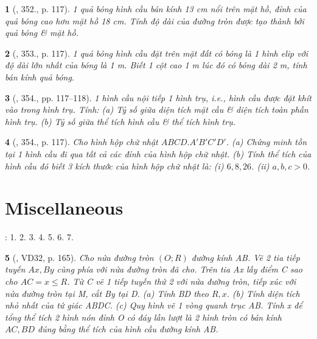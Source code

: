 \documentclass{article}
\newtheorem{baitoan}{}
\begin{document}
\begin{baitoan}[\cite{Binh_Toan_9_tap_2}, 352., p. 117]
	1 quả bóng hình cầu bán kính {\rm13 cm} nổi trên mặt hồ, đỉnh của quả bóng cao hơn mặt hồ {\rm18 cm}. Tính độ dài của đường tròn được tạo thành bởi quả bóng \& mặt hồ.
\end{baitoan}

\begin{baitoan}[\cite{Binh_Toan_9_tap_2}, 353., p. 117]
	1 quả bóng hình cầu đặt trên mặt đất có bóng là 1 hình elip với độ dài lớn nhất của bóng là {\rm1 m}. Biết 1 cột cao {\rm1 m} lúc đó có bóng dài {\rm2 m}, tính bán kính quả bóng.
\end{baitoan}

\begin{baitoan}[\cite{Binh_Toan_9_tap_2}, 354., pp. 117--118]
	1 hình cầu nội tiếp 1 hình trụ, i.e., hình cầu được đặt khít vào trong hình trụ. Tính: (a) Tỷ số giữa diện tích mặt cầu \& diện tích toàn phần hình trụ. (b) Tỷ số giữa thể tích hình cầu \& thể tích hình trụ.
\end{baitoan}

\begin{baitoan}[\cite{Binh_Toan_9_tap_2}, 354., p. 117]
	Cho hình hộp chữ nhật $ABCD.A'B'C'D'$. (a) Chứng minh tồn tại 1 hình cầu đi qua tất cả các đỉnh của hình hộp chữ nhật. (b) Tính thể tích của hình cầu đó biết 3 kích thước của hình hộp chữ nhật là: (i) $6,8,26$. (ii) $a,b,c > 0$.
\end{baitoan}


\section{Miscellaneous}
\cite[BTCCX, pp. 109--110]{SGK_Toan_9_Canh_Dieu_tap_1}: 1. 2. 3. 4. 5. 6. 7.

\begin{baitoan}[\cite{Tuyen_Toan_9_old}, VD32, p. 165]
	Cho nửa đường tròn $(O;R)$ đường kính AB. Vẽ 2 tia tiếp tuyến $Ax,By$ cùng phía với nửa đường tròn đã cho. Trên tia Ax lấy điểm C sao cho $AC = x\le R$. Từ C vẽ 1 tiếp tuyến thứ 2 với nửa đường tròn, tiếp xúc với nửa đường tròn tại M, cắt By tại D. (a) Tính BD theo $R,x$. (b) Tính diện tích nhỏ nhất của tứ giác ABDC. (c) Quy hình vẽ 1 vòng quanh trục AB. Tính x để tổng thể tích 2 hình nón đỉnh O có đáy lần lượt là 2 hình tròn có bán kính $AC,BD$ đúng bằng thể tích của hình cầu đường kính AB.
\end{baitoan}
\end{document}
